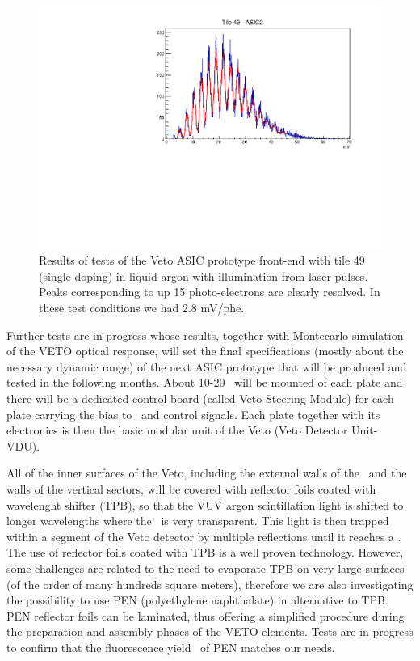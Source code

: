 \begin{figure}[!t]
\includegraphics[height=0.3\textheight]{./Figures/Laser7_8_15peaks.pdf}
\caption[Preliminary Veto ASIC front-end performance.]{Results of tests of the Veto ASIC prototype front-end with tile 49 (single doping) in liquid argon with illumination from laser pulses.
Peaks corresponding to up 15 photo-electrons are clearly resolved. In these test conditions we had 2.8 mV/phe.}
\label{fig:asic_finger}
\end{figure}

Further tests are in progress whose results, together with Montecarlo simulation of the VETO optical response, will set the final specifications (mostly about the necessary dynamic range) of the next ASIC prototype that will be produced and tested in the following months.
About 10-20 \SiPMs\ will be mounted of each plate and there will be a dedicated control board (called Veto Steering Module) for each plate carrying the bias to \SiPMs\ and control signals. Each plate together with its electronics is then  the basic modular unit of the Veto (Veto Detector Unit- VDU).

All of the inner surfaces of the Veto, including the external walls of the \TPC\ and the walls of the vertical sectors, will be covered with reflector foils coated with wavelenght shifter (TPB), so that the VUV argon scintillation light is shifted to longer wavelengths where the \LAr\ is very transparent. This light is then trapped within a segment of the Veto detector by multiple reflections until it reaches a \SiPM. 
The use of reflector foils coated with TPB is a well proven technology. However, some challenges are related to the need to evaporate TPB on very large surfaces  (of the order of many hundreds square meters), therefore we are also investigating the possibility to use PEN (polyethylene naphthalate) in alternative to TPB.  PEN  reflector foils can be laminated, thus offering a simplified procedure during the preparation and assembly phases of the VETO elements. Tests are in progress to confirm that the fluorescence yield~\cite{marcin} of PEN matches our needs.

